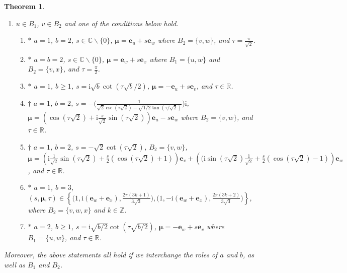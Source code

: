 \documentclass[10pt,a4paper]{amsart}
\newtheorem{theorem}{Theorem}
\def\C{\mathbb{C}}
\def\R{\mathbb{R}}
\def\Z{\mathbb{Z}}
\newcommand{\be}{\mathbf e}
\newcommand{\bmu}{{\boldsymbol{\mu}}}
\def\ii{\mathrm{i}}
\begin{document}
\begin{theorem}
\begin{enumerate}
\item $u\in B_1$, $v\in B_2$ and one of the conditions below hold.
\begin{enumerate}
\item $*$ $a=1$, $b=2$, $s\in\C\backslash\{0\}$, $\bmu=\be_u+s\be_w$ where $B_2=\{v,w\}$, and $\tau=\frac{\pi}{\sqrt{2}}$.
\item $*$ $a=b=2$, $s\in\C\backslash\{0\}$, $\bmu=\be_w+s\be_x$ where $B_1=\{u,w\}$ and $B_2=\{v,x\}$, and $\tau=\frac{\pi}{2}$.
\item $*$ $a=1$, $b\geq 1$, $s=\ii\sqrt{b}\cot(\tau\sqrt{b}/2)
$, $\bmu=-\be_u+s\be_v$, and $\tau\in\R$. 
\item $\dagger$ $a=1$, $b=2$, $s=-\bigg(\frac{1}{\sqrt{2}\csc(\tau\sqrt{2})-\sqrt{1/2}\tan(\tau/\sqrt{2})}\bigg)\ii $, $\bmu=\left(\cos( \tau\sqrt{2})+\ii \frac{s}{\sqrt{2}}\sin(\tau\sqrt{2})\right)\be_u -s\be_w$
where $B_2=\{v,w\}$, and $\tau\in\R$.
\item $\dagger$ $a=1$, $b=2$, $s=-\sqrt{2}\cot(\tau\sqrt{2})$, %
$B_2=\{v,w\}$, $\bmu=\left(\ii\frac{1}{\sqrt{2}}\sin(\tau\sqrt{2})+\frac{s}{2}(\cos(\tau\sqrt{2})+1)\right)\be_v+\left((\ii\sin(\tau\sqrt{2})\frac{1}{\sqrt{2}}+\frac{s}{2}(\cos(\tau\sqrt{2})-1)\right)\be_w$, and $\tau\in\R$.
\item $*$ $a=1$, $b=3$, $(s,\bmu,\tau)\in\left\{\big(1,\ii(\be_w+\be_x),\frac{2\pi(3k+1)}{3\sqrt{3}}\big),\big(1,-\ii(\be_w+\be_x),\frac{2\pi(3k+2)}{3\sqrt{3}}\big)\right\}$, where $B_2=\{v,w,x\}$ and $k\in \Z$.


\item $*$ $a=2$, $b\geq 1$, $s=\ii \sqrt{b/2} \cot(\tau\sqrt{b/2})$, $\bmu=-\be_w+s\be_v$ where $B_1=\{u,w\}$, and $\tau\in\R$.
\end{enumerate}
\end{enumerate}
Moreover, the above statements all hold if we interchange the roles of $a$ and $b$, as well as $B_1$ and $B_2$.
\end{theorem}
\end{document}
